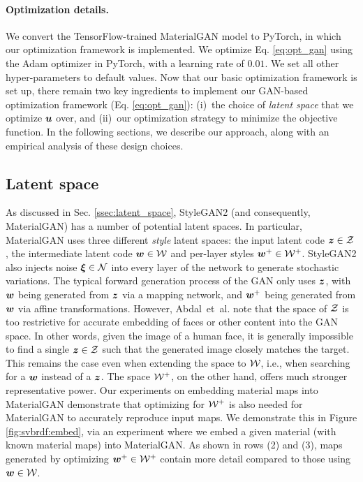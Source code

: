 \paragraph{Optimization details.}
We convert the TensorFlow-trained MaterialGAN model to PyTorch, in which our optimization framework is implemented. We optimize Eq. \ref{eq:opt_gan} using the Adam optimizer in PyTorch, with a learning rate of $0.01$. We set all other hyper-parameters to default values.
Now that our basic optimization framework is set up, there remain two key ingredients to implement our GAN-based optimization framework (Eq. \eqref{eq:opt_gan}): (i)~the choice of \emph{latent space} that we optimize $\bm{u}$ over, and (ii)~our optimization strategy to minimize the objective function. In the following sections, we describe our approach, along with an empirical analysis of these design choices.


\subsection{Latent space}
\label{ssec:latent}

As discussed in Sec. \ref{ssec:latent_space}, StyleGAN2 (and consequently, MaterialGAN) has a number of potential latent spaces.
In particular, MaterialGAN uses three different \emph{style} latent spaces: the input latent code $\bm{z} \in \mathcal{Z}$ , the intermediate latent code $\bm{w} \in \mathcal{W}$ and per-layer styles $\bm{w}^+ \in \mathcal{W}^+$.
StyleGAN2 also injects noise $\bm{\xi} \in \mathcal{N}$ into every layer of the network to generate stochastic variations.
The typical forward generation process of the GAN only uses $\bm{z}$, with $\bm{w}$ being generated from $\bm{z}$ via a mapping network, and $\bm{w}^+$ being generated from $\bm{w}$ via affine transformations.
However, Abdal~et~al. \cite{Abdal19a} note that the space of $\mathcal{Z}$ is too restrictive for accurate embedding of faces or other content into the GAN space.
In other words, given the image of a human face, it is generally impossible to find a single $\bm{z} \in \mathcal{Z}$ such that the generated image closely matches the target.
This remains the case even when extending the space to $\mathcal{W}$, i.e., when searching for a $\bm{w}$ instead of a $\bm{z}$.
The space $\mathcal{W}^+$, on the other hand, offers much stronger representative power.
Our experiments on embedding material maps into MaterialGAN demonstrate that optimizing for $\mathcal{W}^+$ is also needed for MaterialGAN to accurately reproduce input maps.
We demonstrate this in Figure \ref{fig:svbrdf:embed}, via an experiment where we embed a given material (with known material maps) into MaterialGAN.
As shown in rows (2) and (3), maps generated by optimizing $\bm{w}^+ \in \mathcal{W}^+$ contain more detail compared to those using $\bm{w} \in \mathcal{W}$.

